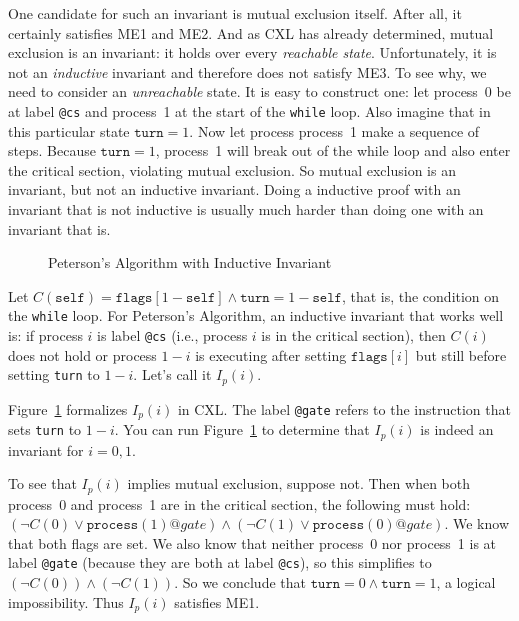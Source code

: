\documentclass{report}
\newenvironment{code}{
\tcolorbox
}{
\endtcolorbox
}
\begin{document}
One candidate for such an invariant is mutual exclusion itself.
After all, it certainly satisfies ME1 and ME2.
And as CXL has already determined, mutual exclusion is an invariant:
it holds over every \emph{reachable state}.
Unfortunately, it is not an \emph{inductive} invariant and therefore does
not satisfy ME3.
To see why, we need to consider an \emph{unreachable} state.
It is easy to construct one: let process~0 be at label \texttt{@cs}
and process~1 at the start of the \texttt{while} loop.
Also imagine that in this particular state $\mathtt{turn} = 1$.  Now let
process process~1 make a sequence of steps.  Because $\mathtt{turn} = 1$,
process~1 will break out of the while loop and also enter the critical
section, violating mutual exclusion.
So mutual exclusion is an invariant, but not an inductive invariant.
Doing a inductive proof with an invariant that is not inductive is usually
much harder than doing one with an invariant that is.

\begin{figure}
\begin{code}

\end{code}
\caption{Peterson's Algorithm with Inductive Invariant}
\label{fig:petersonproof}
\end{figure}

Let $C(\mathtt{self}) = \mathtt{flags}[1 - \mathtt{self}] \land
\mathtt{turn} = 1 - \mathtt{self}$, that is, the condition on the \texttt{while} loop.
For Peterson's Algorithm, an inductive invariant that works well is:
if process $i$ is label \texttt{@cs} (i.e., process $i$ is in the critical section),
then $C(i)$ does not hold or process $1-i$ is executing after setting
$\mathtt{flags}[i]$ but still before setting \texttt{turn} to $1-i$.
Let's call it $I_p(i)$.

Figure~\ref{fig:petersonproof} formalizes $I_p(i)$ in CXL.
The label \texttt{@gate} refers to the instruction that sets \texttt{turn} to $1-i$.
You can run Figure~\ref{fig:petersonproof} to determine
that $I_p(i)$ is indeed an invariant for $i = 0, 1$.

To see that $I_p(i)$ implies mutual exclusion, suppose not.  Then
when both process~0 and process~1 are in the critical section, the
following must hold:
$(\lnot C(0) \lor \mathtt{process}(1)@gate) \land
 (\lnot C(1) \lor \mathtt{process}(0)@gate)$.
We know that both flags are set.
We also know that neither process~0 nor process~1 is at label \texttt{@gate}
(because they are both at label \texttt{@cs}),
so this simplifies to $(\lnot C(0)) \land (\lnot C(1))$.
So we conclude that $\mathtt{turn} = 0 \land \mathtt{turn} = 1$, a
logical impossibility.  Thus $I_p(i)$ satisfies ME1.
\end{document}
